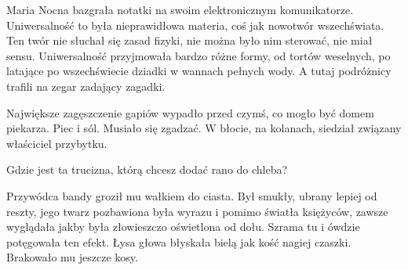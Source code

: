 Maria Nocna bazgrała notatki na swoim elektronicznym komunikatorze.
Uniwersalność to była nieprawidłowa materia, coś jak nowotwór wszechświata.
Ten twór nie słuchał się zasad fizyki, nie można było nim sterować, nie miał sensu.
Uniwersalność przyjmowała bardzo różne formy, od tortów weselnych, po latające po wszechświecie dziadki w wannach pełnych wody.
A tutaj podróżnicy trafili na zegar zadający zagadki.

Największe zagęszczenie gapiów wypadło przed czymś, co mogło być domem piekarza.
Piec i sól. Musiało się zgadzać.
W błocie, na kolanach, siedział związany właściciel przybytku.
\begin{dialogue}
	\ds{} Gdzie jest ta trucizna, którą chcesz dodać rano do chleba?
\end{dialogue}

	Przywódca bandy groził mu wałkiem do ciasta. 
	Był smukły, ubrany lepiej od reszty, jego twarz pozbawiona była wyrazu i pomimo światła księżyców,
	zawsze wyglądała jakby była złowieszczo oświetlona od dołu.
	Szrama tu i ówdzie potęgowała ten efekt.
	Łysa głowa błyskała bielą jak kość nagiej czaszki.
	Brakowało mu jeszcze kosy.
	
